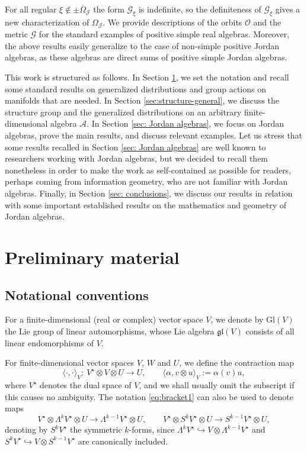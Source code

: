 \documentclass[pdftex]{sigma}
\numberwithin{equation}{section}
\newcommand{\be}{\begin{equation}}
\newcommand{\ee}{\end{equation}}
\newcommand{\ocal}{\mathcal{O}}
\newcommand{\Jcal}{\mathcal{J}}
\newcommand{\Gl}{{\mathrm{Gl}}}
\newcommand{\gl}{{\mathfrak{gl}}}
\newcommand{\cA}{\mathcal{A}}
\newcommand{\Gcal}{\mathcal{G}}
\begin{document}
For all regular $\xi \notin \pm \overline{\Omega}_\Jcal$ the form $\Gcal_\xi$ is indefinite, so the definiteness of $\Gcal_\xi$ gives a new characterization of $\Omega_\Jcal$.
We provide descriptions of the orbits $\ocal$ and the metric $\Gcal$ for the standard examples of positive simple real algebras. Moreover, the above results easily generalize to the case of non-simple positive Jordan algebras, as these algebras are direct sums of positive simple Jordan algebras.

This work is structured as follows.
In Section \ref{sec:prelim}, we set the notation and recall some standard results on generalized distributions and group actions on manifolds that are needed.
In Section \ref{sec:structure-general}, we discuss the structure group and the generalized distributions on an arbitrary finite-dimensional algebra $\cA$.
In Section \ref{sec: Jordan algebras}, we focus on Jordan algebras, prove the main results, and discuss relevant examples.
Let us stress that some results recalled in Section \ref{sec: Jordan algebras} are well known to researchers working with Jordan algebras, but we decided to recall them nonetheless in order to make the work as self-contained
as possible for readers, perhaps coming from information geometry, who are not familiar with Jordan algebras.
Finally, in Section \ref{sec: conclusions}, we discuss our results in relation with some important established results on the mathematics and geometry of Jordan algebras.


\section{Preliminary material} \label{sec:prelim}




\subsection{Notational conventions} \label{sec:notation}


For a finite-dimensional (real or complex) vector space $V$, we denote by $\Gl(V)$ the Lie group of linear automorphisms, whose Lie algebra $\gl(V)$ consists of all linear endomorphisms of $V$.

For finite-dimensional vector spaces $V$, $W$ and $U$, we define the contraction map
\be \label{eq:bracket1}
\langle \cdot, \cdot \rangle_V\colon\ V^\star \otimes V \otimes U \longrightarrow U, \qquad \langle \alpha, v \otimes u \rangle_V := \alpha(v) u,
\ee
where $V^\star$ denotes the dual space of $V$, and we shall usually omit the subscript if this causes no ambiguity. The notation \eqref{eq:bracket1} can also be used to denote maps
\[
V^\star \otimes \Lambda^k V^\star \otimes U \longrightarrow \Lambda^{k-1} V^\star \otimes U, \qquad V^\star \otimes S^k V^\star \otimes U \longrightarrow S^{k-1} V^\star \otimes U,
\]
denoting by $S^k V^\star$ the symmetric $k$-forms, since $\Lambda^k V^\star \hookrightarrow V \otimes \Lambda^{k-1} V^\star$ and $S^k V^\star \hookrightarrow V \otimes S^{k-1} V^\star$ are canonically included.
\end{document}
